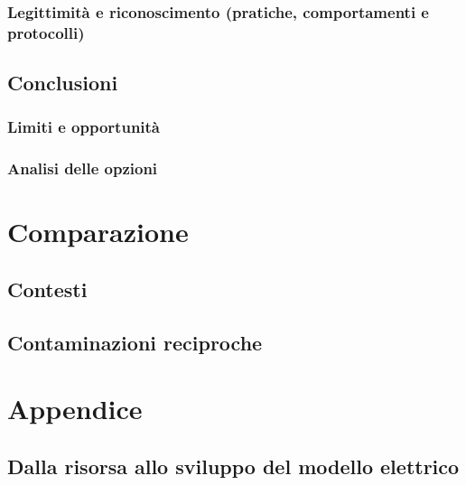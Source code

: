 \documentclass[fleqn,10pt]{SelfArx} %
\begin{document}
\subsubsection{Legittimità e riconoscimento (pratiche, comportamenti e protocolli)}
\subsection{Conclusioni}
\subsubsection{Limiti e opportunità}
\subsubsection{Analisi delle opzioni}
\section{Comparazione}
\subsection{Contesti}
\subsection{Contaminazioni reciproche}

\newpage %

\section{Appendice}

\subsection{Dalla risorsa allo sviluppo del modello elettrico}

\newcommand{\vcutin}{v_{\text{cut\_in}}}
\newcommand{\vcutout}{v_{\text{cut\_out}}}
\newcommand{\vrated}{v_{\text{rated}}}
\end{document}
